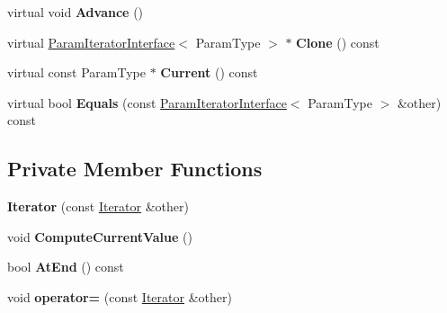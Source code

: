 \begin{DoxyCompactItemize}
virtual void {\bfseries Advance} ()
\item 
\mbox{\label{classtesting_1_1internal_1_1_cartesian_product_generator5_1_1_iterator_a18b35b8f6705a536509512ff3d551c4f}} 
virtual \mbox{\hyperlink{classtesting_1_1internal_1_1_param_iterator_interface}{Param\+Iterator\+Interface}}$<$ Param\+Type $>$ $\ast$ {\bfseries Clone} () const
\item 
\mbox{\label{classtesting_1_1internal_1_1_cartesian_product_generator5_1_1_iterator_a28945854827a5a1cd780bc3f1fa5d19e}} 
virtual const Param\+Type $\ast$ {\bfseries Current} () const
\item 
\mbox{\label{classtesting_1_1internal_1_1_cartesian_product_generator5_1_1_iterator_aaf8e4fd0a1ee835238d3f632bbdc7dd7}} 
virtual bool {\bfseries Equals} (const \mbox{\hyperlink{classtesting_1_1internal_1_1_param_iterator_interface}{Param\+Iterator\+Interface}}$<$ Param\+Type $>$ \&other) const
\end{DoxyCompactItemize}
\subsection*{Private Member Functions}
\begin{DoxyCompactItemize}
\item 
\mbox{\label{classtesting_1_1internal_1_1_cartesian_product_generator5_1_1_iterator_a0e4cb90649b78a4847ed9c217eeda5ea}} 
{\bfseries Iterator} (const \mbox{\hyperlink{classtesting_1_1internal_1_1_cartesian_product_generator5_1_1_iterator}{Iterator}} \&other)
\item 
\mbox{\label{classtesting_1_1internal_1_1_cartesian_product_generator5_1_1_iterator_afd980ef345e70bbff4e8c656e16360be}} 
void {\bfseries Compute\+Current\+Value} ()
\item 
\mbox{\label{classtesting_1_1internal_1_1_cartesian_product_generator5_1_1_iterator_a04aa793eb809999b7ef08bcaefc005ae}} 
bool {\bfseries At\+End} () const
\item 
\mbox{\label{classtesting_1_1internal_1_1_cartesian_product_generator5_1_1_iterator_a462c8641c9261a857b5c7f3c146a45c6}} 
void {\bfseries operator=} (const \mbox{\hyperlink{classtesting_1_1internal_1_1_cartesian_product_generator5_1_1_iterator}{Iterator}} \&other)
\end{DoxyCompactItemize}
